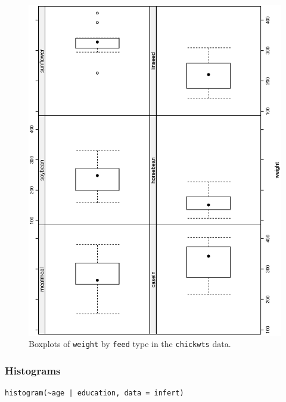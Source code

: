\documentclass[captions=tableheading]{scrbook}
\begin{document}
\begin{figure}[th]
  \includegraphics[angle=270, totalheight=4in]{ps/datadesc/bwplot.ps}
  \caption{Boxplots of \texttt{weight} by \texttt{feed} type in the \texttt{chickwts} data.}
  \label{fig-bwplot}
\end{figure}
\subsubsection{Histograms}
\label{sec-3-6-3-2}



\begin{verbatim}
histogram(~age | education, data = infert)
\end{verbatim}
\end{document}
